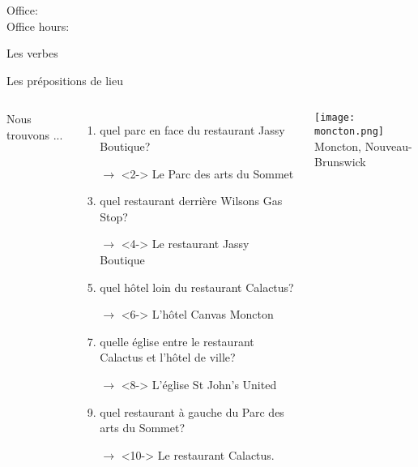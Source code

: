\documentclass{beamer}
\subtitle[Prépositions et verbes \lexi{-re}]{Les prépositions de lieu et les verbes \lexi{-re}}
\begin{document}
  \begin{frame}
    \titlepage
    \tiny{Office: \\
          Office hours: }
  \end{frame}

  \begin{frame}{Les verbes }
    \begin{center}
      
    \end{center}
  \end{frame}

  \begin{frame}{Les prépositions de lieu}
    \begin{columns}
        {\scriptsize
        Nous trouvons ...
        \begin{enumerate}
          \item quel parc en face du restaurant Jassy Boutique?
          \item[$\to$]<2-> Le Parc des arts du Sommet
          \item<3-> quel restaurant derrière Wilsons Gas Stop?
          \item[$\to$]<4-> Le restaurant Jassy Boutique
          \item<5-> quel hôtel loin du restaurant Calactus?
          \item[$\to$]<6-> L'hôtel Canvas Moncton
          \item<7-> quelle église entre le restaurant Calactus et l'hôtel de ville?
          \item[$\to$]<8-> L'église St John's United
          \item<9-> quel restaurant à gauche du Parc des arts du Sommet?
          \item[$\to$]<10-> Le restaurant Calactus.
        \end{enumerate}
        }
        \begin{minipage}[c][0.6\textheight]{\linewidth}
          \begin{center}
            \texttt{[image: moncton.png]} \\
            Moncton, Nouveau-Brunswick
          \end{center}
        \end{minipage}
    \end{columns}
  \end{frame}
\end{document}
